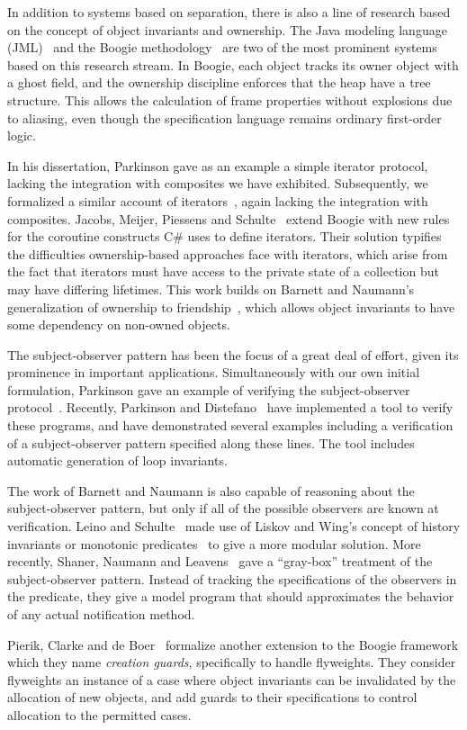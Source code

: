 In addition to systems based on separation, there is also a line of
research based on the concept of object invariants and ownership.  The
Java modeling language (JML)~\cite{jml} and the Boogie
methodology~\cite{boogie} are two of the most prominent systems based
on this research stream. In Boogie, each object tracks its owner
object with a ghost field, and the ownership discipline enforces that
the heap have a tree structure. This allows the calculation of frame
properties without explosions due to aliasing, even though the
specification language remains ordinary first-order logic.

In his dissertation, Parkinson gave as an example a simple iterator
protocol, lacking the integration with composites we have exhibited.
Subsequently, we formalized a similar account of
iterators~\cite{iterator}, again lacking the integration with
composites. Jacobs, Meijer, Piessens and
Schulte~\cite{iterators-revisited} extend Boogie with new rules for
the coroutine constructs C\# uses to define iterators. Their solution
typifies the difficulties ownership-based approaches face with
iterators, which arise from the fact that iterators must have access
to the private state of a collection but may have differing
lifetimes. This work builds on Barnett and Naumann's generalization of
ownership to friendship~\cite{friends}, which allows object invariants
to have some dependency on non-owned objects.

The subject-observer pattern has been the focus of a great deal of effort,
given its prominence in important applications. Simultaneously with our own
initial formulation, Parkinson gave an example of verifying the
subject-observer protocol~\cite{parkinson-so}. Recently, Parkinson and
Distefano~\cite{jstar-parkinson-distefano} have implemented a tool to verify
these programs, and have demonstrated several examples including a verification
of a subject-observer pattern specified along these lines. The tool includes
automatic generation of loop invariants. 

The work of Barnett and Naumann is also capable of reasoning about the
subject-observer pattern, but only if all of the possible observers
are known at verification.  Leino and Schulte~\cite{boogie-sub-obs}
made use of Liskov and Wing's concept of history invariants or
monotonic predicates~\cite{liskov-wing} to give a more modular
solution. More recently, Shaner, Naumann and Leavens~\cite{ShanerLN07}
gave a ``gray-box'' treatment of the subject-observer pattern.
Instead of tracking the specifications of the observers in the
predicate, they give a model program that should approximates the
behavior of any actual notification method.

Pierik, Clarke and de Boer~\cite{creational-invariants} formalize another
extension to the Boogie framework which they name \emph{creation
  guards}, specifically to handle flyweights. They consider flyweights
an instance of a case where object invariants can be invalidated by
the allocation of new objects, and add guards to their specifications
to control allocation to the permitted cases. 



